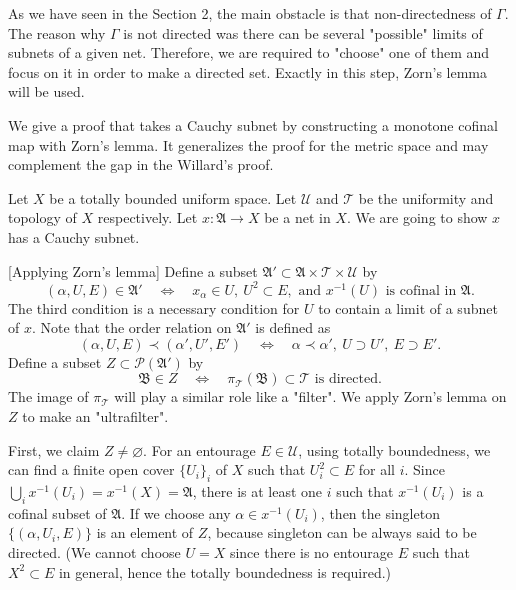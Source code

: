 \documentclass[12pt]{article}
\begin{document}
As we have seen in the Section 2, the main obstacle is that non-directedness of $\Gamma$.
The reason why $\Gamma$ is not directed was there can be several "possible" limits of subnets of a given net.
Therefore, we are required to "choose" one of them and focus on it in order to make a directed set.
Exactly in this step, Zorn's lemma will be used.
 
We give a proof that takes a Cauchy subnet by constructing a monotone cofinal map with Zorn's lemma.
It generalizes the proof for the metric space and may complement the gap in the Willard's proof.

\begin{pf}[1 of Theorem 1.1]
Let $X$ be a totally bounded uniform space.
Let $\mathcal{U}$ and $\mathcal{T}$ be the uniformity and topology of $X$ respectively.
Let $x:\mathfrak{A}\to X$ be a net in $X$.
We are going to show $x$ has a Cauchy subnet.

[Applying Zorn's lemma]
Define a subset $\mathfrak{A}'\subset\mathfrak{A}\times\mathcal{T}\times\mathcal{U}$ by
\[(\alpha,U,E)\in\mathfrak{A}'\quad\Leftrightarrow\quad x_\alpha\in U,\ U^2\subset E,\text{ and }x^{-1}(U)\text{ is cofinal in }\mathfrak{A}.\]
The third condition is a necessary condition for $U$ to contain a limit of a subnet of $x$.
Note that the order relation on $\mathfrak{A}'$ is defined as
\[(\alpha,U,E)\prec(\alpha',U',E')\quad\Leftrightarrow\quad \alpha\prec\alpha',\ U\supset U',\ E\supset E'.\]
Define a subset $Z\subset\mathcal{P}(\mathfrak{A}')$ by
\[\mathfrak{B}\in Z\quad\Leftrightarrow\quad\pi_\mathcal{T}(\mathfrak{B})\subset\mathcal{T}\text{ is directed}.\]
The image of $\pi_\mathcal{T}$ will play a similar role like a "filter".
We apply Zorn's lemma on $Z$ to make an "ultrafilter".

First, we claim $Z\ne\varnothing$.
For an entourage $E\in\mathcal{U}$, using totally boundedness, we can find a finite open cover $\{U_i\}_i$ of $X$ such that $U_i^2\subset E$ for all $i$.
Since $\bigcup_ix^{-1}(U_i)=x^{-1}(X)=\mathfrak{A}$, there is at least one $i$ such that $x^{-1}(U_i)$ is a cofinal subset of $\mathfrak{A}$.
If we choose any $\alpha\in x^{-1}(U_i)$, then the singleton $\{(\alpha,U_i,E)\}$ is an element of $Z$, because singleton can be always said to be directed.
(We cannot choose $U=X$ since there is no entourage $E$ such that $X^2\subset E$ in general, hence the totally boundedness is required.)


\end{pf}
\end{document}

